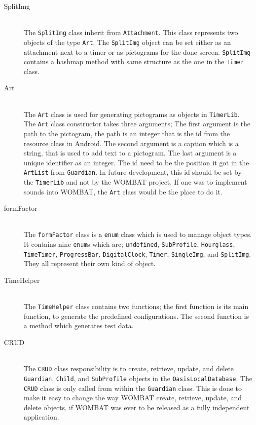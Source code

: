 \begin{description}
	\item[SplitImg] \hfill \\
    The \texttt{SplitImg} class inherit from \texttt{Attachment}. This class represents two objects of the type \texttt{Art}. The \texttt{SplitImg} object can be set either as an attachment next to a timer or as pictograms for the done screen. \texttt{SplitImg} contains a hashmap method with same structure as the one in the \texttt{Timer} class.

  \item[Art] \hfill \\
  The \texttt{Art} class is used for generating pictograms as objects in \texttt{TimerLib}. The \texttt{Art} class constructor takes three arguments; The first argument is the path to the pictogram, the path is an integer that is the id from the resource class in Android. The second argument is a caption which is a string, that is used to add text to a pictogram. The last argument is a unique identifier as an integer. The id need to be the position it got in the \texttt{ArtList} from \texttt{Guardian}. In future development, this id should be set by the \texttt{TimerLib} and not by the WOMBAT project. If one was to implement sounds into WOMBAT, the \texttt{Art} class would be the place to do it.
	
  \item[formFactor] \hfill \\
	The \texttt{formFactor} class is a \texttt{enum} class which is used to manage object types. It contains nine \texttt{enum}s which are; \texttt{undefined}, \texttt{SubProfile}, \texttt{Hourglass}, \texttt{TimeTimer}, \texttt{ProgressBar}, \texttt{DigitalClock}, \texttt{Timer}, \texttt{SingleImg}, and \texttt{SplitImg}. They all represent their own kind of object.
	
	\item[TimeHelper] \hfill \\
  The \texttt{TimeHelper} class contains two functions; the first function is its main function, to generate the predefined configurations. The second function is a method which generates test data.	
	
  \item[CRUD] \hfill \\
	The \texttt{CRUD} class responsibility is to create, retrieve, update, and delete \texttt{Guardian}, \texttt{Child}, and \texttt{SubProfile} objects in the \texttt{OasisLocalDatabase}. The \texttt{CRUD} class is only called from within the \texttt{Guardian} class. This is done to make it easy to change the way WOMBAT create, retrieve, update, and delete objects, if WOMBAT was ever to be released as a fully independent application.
	\end{description}

